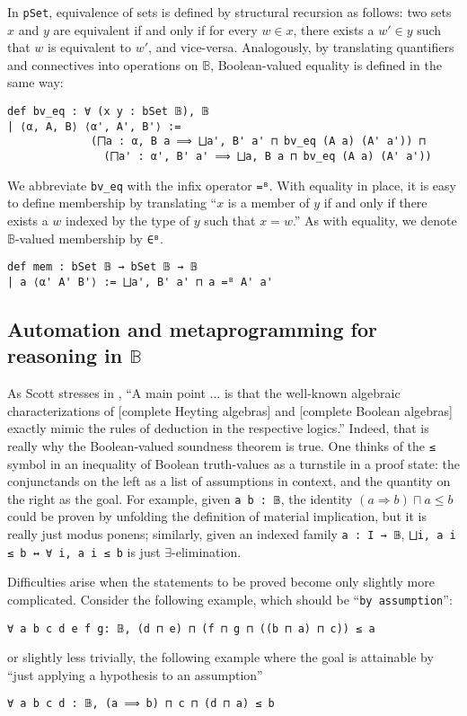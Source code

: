 \documentclass[a4paper,USenglish,cleveref, autoref]{lipics-v2019}
\newcommand{\B}{\mathbb{B}}
\newcommand{\lil}{\lstinline}
\theoremstyle{theorem}
\theoremstyle{definition}
\begin{document}
In \lil{pSet}, equivalence of sets is defined by structural recursion as follows: two sets $x$ and $y$ are equivalent if and only if for every $w \in x$, there exists a $w' \in y$ such that $w$ is equivalent to $w'$, and vice-versa. Analogously, by translating quantifiers and connectives into operations on $\B$, Boolean-valued equality is defined in the same way:
\begin{lstlisting}
def bv_eq : ∀ (x y : bSet 𝔹), 𝔹
| ⟨α, A, B⟩ ⟨α', A', B'⟩ :=
             (⨅a : α, B a ⟹ ⨆a', B' a' ⊓ bv_eq (A a) (A' a')) ⊓
               (⨅a' : α', B' a' ⟹ ⨆a, B a ⊓ bv_eq (A a) (A' a'))
\end{lstlisting}

We abbreviate \lil{bv_eq} with the infix operator \lil{=ᴮ}. With equality in place, it is easy to define membership by translating ``$x$ is a member of $y$ if and only if there exists a $w$ indexed by the type of $y$ such that $x = w$.'' As with equality, we denote $\B$-valued membership by \lil{∈ᴮ}.

\begin{lstlisting}
def mem : bSet 𝔹 → bSet 𝔹 → 𝔹
| a ⟨α' A' B'⟩ := ⨆a', B' a' ⊓ a =ᴮ A' a'
\end{lstlisting}

\subsection{Automation and metaprogramming for reasoning in $\B$} \label{subsect:proof-language}
As Scott stresses in \cite{scott2008algebraic}, ``A main point ... is that the well-known algebraic characterizations of [complete Heyting algebras] and [complete Boolean algebras] exactly mimic the rules of deduction in the respective logics.'' Indeed, that is really why the Boolean-valued soundness theorem is true. One thinks of the \lil{≤} symbol in an inequality of Boolean truth-values as a turnstile in a proof state: the conjunctands on the left as a list of assumptions in context, and the quantity on the right as the goal. For example, given \lil{a b : 𝔹}, the identity $(a \Rightarrow b) \sqcap a \leq b$ could be proven by unfolding the definition of material implication, but it is really just modus ponens; similarly, given an indexed family \lil{a : I → 𝔹}, \lstinline{⨆i, a i ≤ b ↔ ∀ i, a i ≤ b} is just $\exists$-elimination.

Difficulties arise when the statements to be proved become only slightly more complicated. Consider the following example, which should be  ``\lil{by assumption}'':
\begin{lstlisting}[gobble=2]
  ∀ a b c d e f g: 𝔹, (d ⊓ e) ⊓ (f ⊓ g ⊓ ((b ⊓ a) ⊓ c)) ≤ a
\end{lstlisting}
or slightly less trivially, the following example where the goal is attainable by ``just applying a hypothesis to an assumption''
\begin{lstlisting}[gobble=2]
  ∀ a b c d : 𝔹, (a ⟹ b) ⊓ c ⊓ (d ⊓ a) ≤ b
\end{lstlisting}
\end{document}
